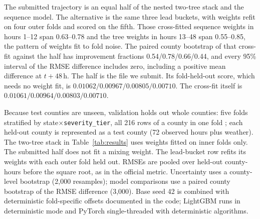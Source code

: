 \documentclass[10pt]{article}
\makeatletter
\renewcommand\subsection{\@startsection{subsection}{2}{\z@}{-1.8ex\@plus -1ex \@minus -.2ex}{1ex \@plus .2ex}{\normalfont\normalsize\bfseries}}
\makeatother
\begin{document}
The submitted trajectory is an equal half of the nested two-tree stack and the sequence model. The alternative is the same three lead buckets, with weights refit on four outer folds and scored on the fifth. Those cross-fitted sequence weights in hours 1--12 span 0.63--0.78 and the tree weights in hours 13--48 span 0.55--0.85, the pattern of weights fit to fold noise. The paired county bootstrap of that cross-fit against the half has improvement fractions 0.54/0.78/0.66/0.44, and every 95\% interval of the RMSE difference includes zero, including a positive mean difference at $t{+}48$\,h. The half is the file we submit. Its fold-held-out score, which needs no weight fit, is $0.01062/0.00967/0.00805/0.00710$. The cross-fit itself is $0.01061/0.00964/0.00803/0.00710$.

\subsection{Validation protocol}
Because test counties are unseen, validation holds out whole counties: five folds stratified by state$\times$\texttt{severity\_tier}, all 216 rows of a county in one fold \citep{bergmeir2012,roberts2017}; each held-out county is represented as a test county (72 observed hours plus weather). The two-tree stack in Table~\ref{tab:results} uses weights fitted on inner folds only. The submitted half does not fit a mixing weight. The lead-bucket row refits its weights with each outer fold held out. RMSEs are pooled over held-out county-hours before the square root, as in the official metric. Uncertainty uses a county-level bootstrap (2{,}000 resamples); model comparisons use a paired county bootstrap of the RMSE difference (3{,}000). Base seed 42 is combined with deterministic fold-specific offsets documented in the code; LightGBM runs in deterministic mode and PyTorch single-threaded with deterministic algorithms.
\end{document}
